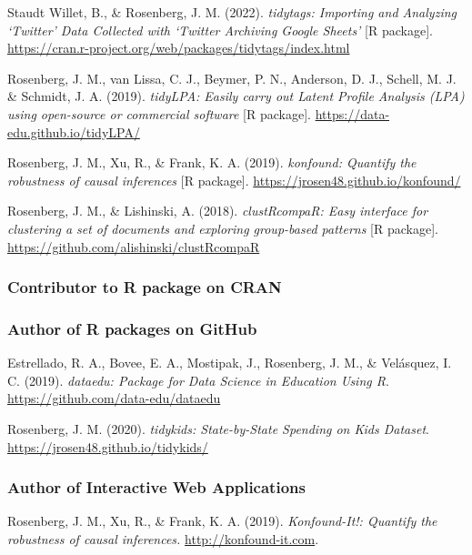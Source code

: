 \documentclass[
  14,
]{article}
\begin{document}
Staudt Willet, B., \& Rosenberg, J. M. (2022). \emph{tidytags: Importing
and Analyzing `Twitter' Data Collected with `Twitter Archiving Google
Sheets'} {[}R package{]}.
\url{https://cran.r-project.org/web/packages/tidytags/index.html}

Rosenberg, J. M., van Lissa, C. J., Beymer, P. N., Anderson, D. J.,
Schell, M. J. \& Schmidt, J. A. (2019). \emph{tidyLPA: Easily carry out
Latent Profile Analysis (LPA) using open-source or commercial software}
{[}R package{]}. \url{https://data-edu.github.io/tidyLPA/}

Rosenberg, J. M., Xu, R., \& Frank, K. A. (2019). \emph{konfound:
Quantify the robustness of causal inferences} {[}R package{]}.
\url{https://jrosen48.github.io/konfound/}

Rosenberg, J. M., \& Lishinski, A. (2018). \emph{clustRcompaR: Easy
interface for clustering a set of documents and exploring group-based
patterns} {[}R package{]}.
\url{https://github.com/alishinski/clustRcompaR}

\hypertarget{contributor-to-r-package-on-cran}{%
\subsubsection{Contributor to R package on
CRAN}\label{contributor-to-r-package-on-cran}}

\hypertarget{author-of-r-packages-on-github}{%
\subsubsection{Author of R packages on
GitHub}\label{author-of-r-packages-on-github}}

Estrellado, R. A., Bovee, E. A., Mostipak, J., Rosenberg, J. M., \&
Velásquez, I. C. (2019). \emph{dataedu: Package for Data Science in
Education Using R}. \url{https://github.com/data-edu/dataedu}

Rosenberg, J. M. (2020). \emph{tidykids: State-by-State Spending on Kids
Dataset}. \url{https://jrosen48.github.io/tidykids/}

\hypertarget{author-of-interactive-web-applications}{%
\subsubsection{Author of Interactive Web
Applications}\label{author-of-interactive-web-applications}}

Rosenberg, J. M., Xu, R., \& Frank, K. A. (2019). \emph{Konfound-It!:
Quantify the robustness of causal inferences.}
\url{http://konfound-it.com}.
\end{document}
